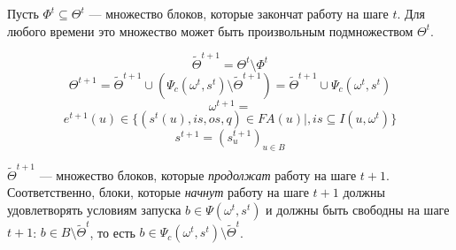\documentclass[10pt,a4paper]{article}
\newcommand{\FA}{F\!A}
\begin{document}
Пусть $\Phi^t \subseteq \Theta^t$ --- множество блоков, которые закончат работу на шаге $t$. Для любого времени это множество может быть произвольным подмножеством $\Theta^t$.

$$\tilde{\Theta}^{t + 1} = \Theta^t \setminus \Phi^t$$
$$\Theta^{t + 1} = \tilde{\Theta}^{t + 1} \cup (\Psi_c(\omega^t, s^t) \setminus \tilde{\Theta}^{t + 1}) = \tilde{\Theta}^{t + 1} \cup \Psi_c(\omega^t, s^t)$$
$$\omega^{t + 1} = $$
$$e^{t + 1}(u) \in \{ (s^t(u), is, os, q) \in \FA(u) \vert, is \subseteq I(u, \omega^t) \}$$
$$s^{t + 1} = (s^{t + 1}_u)_{u \in B}$$

$\tilde{\Theta}^{t + 1}$ --- множество блоков, которые \textit{продолжат} работу на шаге $t + 1$.
Соответственно, блоки, которые \textit{начнут} работу на шаге $t + 1$ должны удовлетворять условиям запуска $b \in \Psi(\omega^t, s^t)$ и
должны быть свободны на шаге $t + 1$: $b \in B \setminus \tilde{\Theta}^t$, то есть $b \in \Psi_c(\omega^t, s^t) \setminus \tilde{\Theta}^t$.
\end{document}
